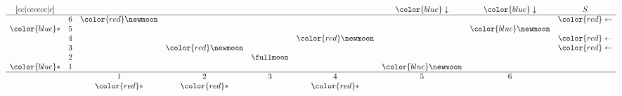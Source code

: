 \[ 
	\begin{matrix}[cc|cccccc|c]  
		                &   &                       &                       &           &                       & {\color{blue}\downarrow} & {\color{blue}\downarrow} & S                       \\ \hline  
		                & 6 & {\color{red}\newmoon} &                       &           &                       &                          &                          & {\color{red}\leftarrow} \\   
		{\color{blue}*} & 5 &                       &                       &           &                       &                          & {\color{blue}\newmoon}   &                         \\   
		                & 4 &                       &                       &           & {\color{red}\newmoon} &                          &                          & {\color{red}\leftarrow} \\   
		                & 3 &                       & {\color{red}\newmoon} &           &                       &                          &                          & {\color{red}\leftarrow} \\  
		                & 2 &                       &                       & \fullmoon &                       &                          &                          &                         \\ 
		{\color{blue}*} & 1 &                       &                       &           &                       & {\color{blue}\newmoon}   &                          &                         \\ \hline
		                &   & 1                     & 2                     & 3         & 4                     & 5                        & 6                        &                         \\
		                &   & {\color{red}*}        & {\color{red}*}        &           & {\color{red}*}        &                          &                          &                         
	\end{matrix} 
\]
